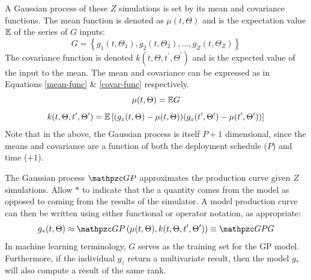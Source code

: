A Gaussian process of these $Z$ simulations is set by its mean and
covariance functions. The mean function is denoted as $\mu(t, \Theta)$ and
is the expectation value $\mathbb{E}$ of
the series of $G$ inputs:
\begin{equation}
\label{G}
G = \left\{g_1(t, \Theta_1), g_2(t, \Theta_2), \ldots,
           g_Z(t, \Theta_Z)\right\}
\end{equation}
The covariance function is denoted $k(t, \Theta, t^\prime, \Theta^\prime)$
and is the expected value of the input to the mean. The mean and
covariance can be expressed as
in Equations \ref{mean-func} \& \ref{covar-func} respectively.
\begin{equation}
\label{mean-func}
\mu(t, \Theta) = \mathbb{E} G
\end{equation}
\begin{equation}
\label{covar-func}
k(t, \Theta, t^\prime, \Theta^\prime) =
    \mathbb{E}\left[(g_z(t, \Theta) - \mu(t, \Theta))
            (g_z(t^\prime, \Theta^\prime) - \mu(t^\prime, \Theta^\prime))
      \right]
\end{equation}
Note that in the above, the Gaussian process is itself $P+1$ dimensional,
since the means and covariance are a function of both the deployment
schedule ($P$) and time ($+1$).

The Gaussian process $\GP$ approximates the production curve
given $Z$ simulations. Allow $*$ to indicate that the a quantity comes from
the model as opposed to coming from the results of the simulator. A model
production curve can then be written using either functional or operator
notation, as appropriate:
\begin{equation}
\label{gp-def-approx}
g_*(t, \Theta) \approx \GP\left(\mu(t, \Theta),
                                 k(t, \Theta, t^\prime, \Theta^\prime)\right)
                \equiv \GP G
\end{equation}
In machine learning terminology, $G$ serves as the training set for the
GP model. Furthermore, if the individual $g_z$ return a
multivariate result, then the model $g_*$ will also compute a result of
the same rank.

